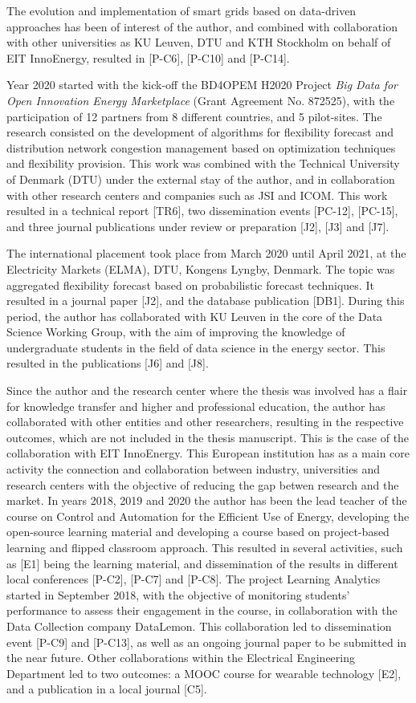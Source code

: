 The evolution and implementation of smart grids based on data-driven approaches has been of interest of the author, and combined with collaboration with other universities as KU Leuven, DTU and KTH Stockholm on behalf of EIT InnoEnergy, resulted in [P-C6], [P-C10] and [P-C14]. 

Year 2020 started with the kick-off the BD4OPEM H2020 Project \textit{Big Data for Open Innovation Energy Marketplace} (Grant Agreement No. 872525), with the participation of 12 partners from 8 different countries, and 5 pilot-sites. The research consisted on the development of algorithms for flexibility forecast and distribution network congestion management based on optimization techniques and flexibility provision. This work was combined with the Technical University of Denmark (DTU) under the external stay of the author, and in collaboration with other research centers and companies such as JSI and ICOM. This work resulted in a technical report [TR6], two dissemination events [PC-12], [PC-15], and three journal publications under review or preparation [J2], [J3] and [J7].  

The international placement took place from March 2020 until April 2021, at the Electricity Markets (ELMA), DTU, Kongens Lyngby, Denmark. The topic was aggregated flexibility forecast based on probabilistic forecast techniques. It resulted in a journal paper [J2], and the database publication [DB1]. During this period, the author has collaborated with KU Leuven in the core of the Data Science Working Group, with the aim of improving the knowledge of undergraduate students in the field of data science in the energy sector. This resulted in the publications [J6] and [J8]. 

Since the author and the research center where the thesis was involved has a flair for knowledge transfer and higher and professional education, the author has collaborated with other entities and other researchers, resulting in the respective outcomes, which are not included in the thesis manuscript. This is the case of the collaboration with EIT InnoEnergy. This European institution has as a main core activity the connection and collaboration between industry, universities and research centers with the objective of reducing the gap betwen research and the market. In years 2018, 2019 and 2020 the author has been the lead teacher of the course on Control and Automation for the Efficient Use of Energy, developing the open-source learning material and developing a course based on project-based learning and flipped classroom approach. This resulted in several activities, such as [E1] being the learning material, and dissemination of the results in different local conferences [P-C2], [P-C7] and [P-C8]. The project Learning Analytics started in September 2018, with the objective of monitoring students' performance to assess their engagement in the course, in collaboration with the Data Collection company DataLemon. This collaboration led to dissemination event [P-C9] and [P-C13], as well as an ongoing journal paper to be submitted in the near future. Other collaborations within the Electrical Engineering Department led to two outcomes: a MOOC course for wearable technology [E2], and a publication in a local journal [C5]. 


